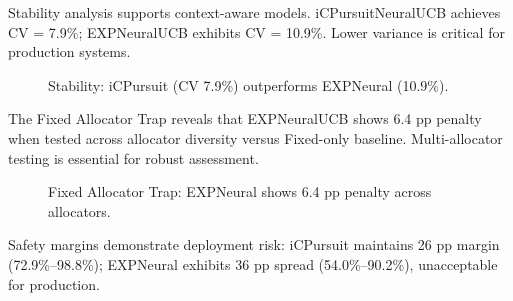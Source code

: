 \documentclass[sigconf,anonymous]{acmart}
\begin{document}
Stability analysis supports context-aware models. iCPursuitNeuralUCB achieves CV = 7.9\%; EXPNeuralUCB exhibits CV = 10.9\%. Lower variance is critical for production systems.

\begin{figure}[tb]
\centering
{}
\caption{Stability: iCPursuit (CV 7.9\%) outperforms EXPNeural (10.9\%).}
\label{fig:stability}
\end{figure}

The Fixed Allocator Trap reveals that EXPNeuralUCB shows 6.4 pp penalty when tested across allocator diversity versus Fixed-only baseline. Multi-allocator testing is essential for robust assessment.

\begin{figure}[tb]
\centering
{}
\caption{Fixed Allocator Trap: EXPNeural shows 6.4 pp penalty across allocators.}
\label{fig:generalization}
\end{figure}

Safety margins demonstrate deployment risk: iCPursuit maintains 26 pp margin (72.9\%--98.8\%); EXPNeural exhibits 36 pp spread (54.0\%--90.2\%), unacceptable for production.
\end{document}

